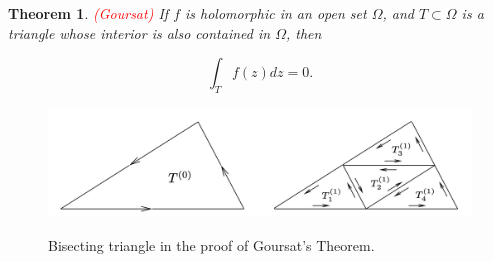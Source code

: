 \documentclass{article}
\newtheorem{theorem}{Theorem}
\begin{document}
\begin{theorem} \textcolor{red}{(Goursat)}
If $f$ is holomorphic in an open set $\Omega$, and $T\subset\Omega$ is a triangle whose interior is also contained in $\Omega$, then

\begin{equation*}
\int_T f(z)dz=0.
\end{equation*}

\end{theorem}

\begin{figure}
\centering
\includegraphics[scale=0.3]{Goursat.png} \\
\caption{Bisecting triangle in the proof of Goursat's Theorem.} 
\label{fig:goursat}
\end{figure}
\end{document}
